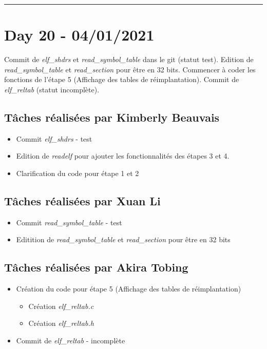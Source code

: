 \documentclass[11pt,letterpaper]{article}
\begin{document}
\noindent\rule{13cm}{0.4pt}

\section*{Day 20 - 04/01/2021}
Commit de \textit{elf\_shdrs} et \textit{read\_symbol\_table} dans le git (statut
test). Edition de \textit{read\_symbol\_table} et \textit{read\_section} pour 
être en 32 bits. Commencer à coder les fonctions de l'étape 5 (Affichage des tables 
de réimplantation). Commit de \textit{elf\_reltab} (statut incomplète).


\subsection*{Tâches réalisées par Kimberly Beauvais}
\begin{itemize}
    \item Commit \textit{elf\_shdrs} - test
    \item Edition de \textit{readelf} pour ajouter les fonctionnalités des étapes
    3 et 4. 
    \item Clarification du code pour étape 1 et 2
\end{itemize}

\subsection*{Tâches réalisées par Xuan Li}
\begin{itemize}
    \item Commit \textit{read\_symbol\_table} - test
    \item Editition de \textit{read\_symbol\_table} et \textit{read\_section} 
    pour être en 32 bits
\end{itemize}

\subsection*{Tâches réalisées par Akira Tobing}
\begin{itemize}
    \item Création du code pour étape 5 (Affichage des tables de réimplantation)
    \begin{itemize}
        \item Création \textit{elf\_reltab.c} 
        \item Création \textit{elf\_reltab.h}
    \end{itemize}
    \item Commit de \textit{elf\_reltab} - incomplète
\end{itemize}
\end{document}
